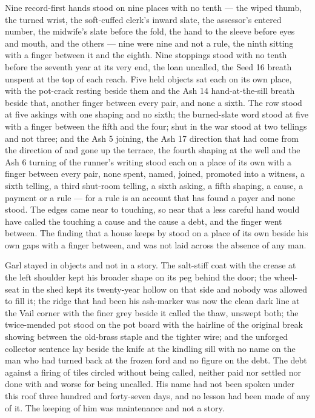 Nine record-first hands stood on nine places with no tenth --- the wiped thumb, the turned wrist, the soft-cuffed clerk's inward slate, the assessor's entered number, the midwife's slate before the fold, the hand to the sleeve before eyes and mouth, and the others --- nine were nine and not a rule, the ninth sitting with a finger between it and the eighth. Nine stoppings stood with no tenth before the seventh year at its very end, the loan uncalled, the Seed 16 breath unspent at the top of each reach. Five held objects sat each on its own place, with the pot-crack resting beside them and the Ash 14 hand-at-the-sill breath beside that, another finger between every pair, and none a sixth. The row stood at five askings with one shaping and no sixth; the burned-slate word stood at five with a finger between the fifth and the four;  shut in the war stood at two tellings and not three; and the Ash 5 joining, the Ash 17 direction that had come from the direction of  and gone up the terrace, the fourth shaping at the well and the Ash 6 turning of the runner's writing stood each on a place of its own with a finger between every pair, none spent, named, joined, promoted into a witness, a sixth telling, a third shut-room telling, a sixth asking, a fifth shaping, a cause, a payment or a rule --- for a rule is an account that has found a payer and none stood. The edges came near to touching, so near that a less careful hand would have called the touching a cause and the cause a debt, and the finger went between. The finding that a house keeps by  stood on a place of its own beside his own gaps with a finger between, and was not laid across the absence of any man.

Garl stayed in objects and not in a story. The salt-stiff coat with the crease at the left shoulder kept his broader shape on its peg behind the door; the wheel-seat in the shed kept its twenty-year hollow on that side and nobody was allowed to fill it; the ridge that had been his ash-marker was now the clean dark line at the Vail corner with the finer grey beside it called the thaw, unswept both; the twice-mended pot stood on the pot board with the hairline of the original break showing between the old-brass staple and the tighter wire; and the unforged collector sentence lay beside the knife at the kindling sill with no name on the man who had turned back at the frozen ford and no figure on the debt. The debt against a firing of tiles circled without being called, neither paid nor settled nor done with and worse for being uncalled. His name had not been spoken under this roof three hundred and forty-seven days, and no lesson had been made of any of it. The keeping of him was maintenance and not a story.

